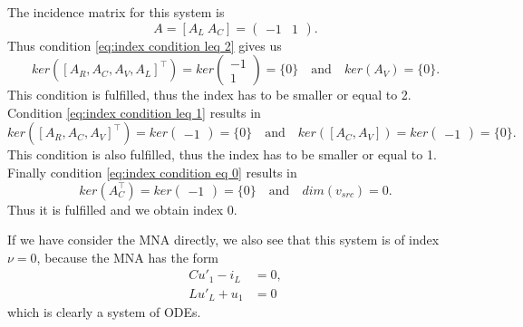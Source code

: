 \begin{example2}
	The incidence matrix for this system is
	\begin{displaymath}
		A = [A_L~A_C] = 
		\left(
		\begin{matrix}
			-1 & 1
		\end{matrix}
		\right).
	\end{displaymath} 
	Thus condition \eqref{eq:index condition leq 2} gives us
	\begin{displaymath}
		ker([A_R, A_C, A_V, A_L]^\top) = ker
		\left(
		\begin{matrix}
			-1 \\
			1
		\end{matrix}
		\right) = \{0\}
		\quad \text{and} \quad 
		ker(A_V) = \{0\}.
	\end{displaymath}
	This condition is fulfilled, thus the index has to be smaller or equal to 2. \\
	Condition \eqref{eq:index condition leq 1} results in
	\begin{displaymath}
		ker([A_R, A_C, A_V]^\top) = ker\left(
		\begin{matrix}
			-1
		\end{matrix}
		\right) = \{0\}
		\quad \text{and} \quad
		ker([A_C, A_V]) = ker
		\left(
		\begin{matrix}
			-1
		\end{matrix}
		\right) = \{0\}.
	\end{displaymath}
	This condition is also fulfilled, thus the index has to be smaller or equal to 1.\\
	Finally condition \eqref{eq:index condition eq 0} results in
	\begin{displaymath}
		ker(A_C^\top) = ker\left(
		\begin{matrix}
			-1
		\end{matrix}
		\right) = \{0\}		
		\quad \text{and} \quad 
		dim(v_{src}) = 0.
	\end{displaymath}
	Thus it is fulfilled and we obtain index 0.
	
	If we have consider the MNA directly, we also see that this system is of index $\nu = 0$, because the MNA has the form
	\begin{displaymath}
		\begin{aligned}
			C u'_1 - i_L &= 0, \\
			L u'_L + u_1 &= 0
		\end{aligned}
	\end{displaymath}
	which is clearly a system of ODEs.
\end{example2}
	
